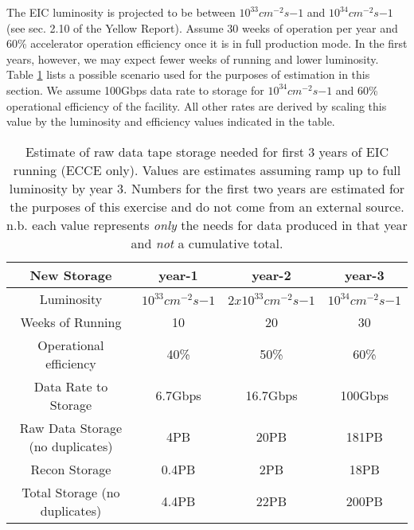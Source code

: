 


The EIC luminosity is projected to be between $10^{33}cm^{-2}s{-1}$ and $10^{34}cm^{-2}s{-1}$ (see sec. 2.10 of the Yellow Report\cite{eic_yellow_report_v1_1}). Assume 30 weeks of operation per year and 60\% accelerator operation efficiency once it is in full production mode. In the first years, however, we may expect fewer weeks of running and lower luminosity. Table \ref{tab:integrated_luminosity_by_year} lists a possible scenario used for the purposes of estimation in this section. We assume 100Gbps data rate to storage for $10^{34}cm^{-2}s{-1}$ and 60\% operational efficiency of the facility. All other rates are derived by scaling this value by the luminosity and efficiency values indicated in the table.


\begin{table}[htb!]
    \centering
    \begin{tabular}{c|c|c|c}
        \hline
        \hline
         \textbf{New Storage}       & year-1                & year-2                  & year-3                \\
        \hline
         Luminosity              & $10^{33}cm^{-2}s{-1}$ & $2x10^{33}cm^{-2}s{-1}$ & $10^{34}cm^{-2}s{-1}$ \\
         \hline
         Weeks of Running        & 10                    & 20                      & 30                    \\
         \hline
         Operational efficiency    & 40\%                  & 50\%                    & 60\%                  \\
         \hline
         Data Rate to Storage    & 6.7Gbps               & 16.7Gbps                & 100Gbps               \\
         \hline
         Raw Data Storage (no duplicates) & 4PB          & 20PB                    & 181PB                 \\
         \hline
         Recon Storage          & 0.4PB                  & 2PB                    & 18PB                   \\
         \hline
         Total Storage (no duplicates) & 4.4PB           & 22PB                   & 200PB                  \\
         \hline
   \end{tabular}
    \caption{Estimate of raw data tape storage needed for first 3 years of EIC running (ECCE only). Values are estimates assuming ramp up to full luminosity  by year 3. Numbers for the first two years are estimated for the purposes of this exercise and do not come from an external source. n.b. each value represents \emph{only} the needs for data produced in that year and \emph{not} a cumulative total.}
    \label{tab:integrated_luminosity_by_year}
\end{table}

